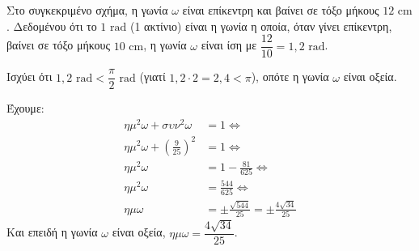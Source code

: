 \begin{alist}
\item
\begin{rlist}
\item Στο συγκεκριμένο σχήμα, η γωνία $\omega$ είναι επίκεντρη και βαίνει σε τόξο μήκους $12\text{ cm}$. Δεδομένου ότι το $1\text{ rad}$ (1 ακτίνιο) είναι η γωνία η οποία, όταν γίνει επίκεντρη, βαίνει σε τόξο μήκους $10\text{ cm}$, η γωνία $\omega$ είναι ίση με $\dfrac{12}{10} = 1{,}2\text{ rad}$.
\item Ισχύει ότι $1{,}2\text{ rad} < \dfrac{\pi}{2}\text{ rad}$ (γιατί $1{,}2 \cdot 2 = 2{,}4 < \pi$), οπότε η γωνία $\omega$ είναι οξεία.
\end{rlist}

\item Έχουμε:
\begin{align*}
\eta\mu^2\omega + \sigma\upsilon\nu^2\omega &= 1 \Leftrightarrow \\
\eta\mu^2\omega + \left(\frac{9}{25}\right)^2 &= 1 \Leftrightarrow \\
\eta\mu^2\omega &= 1 - \frac{81}{625} \Leftrightarrow \\
\eta\mu^2\omega &= \frac{544}{625} \Leftrightarrow \\
\eta\mu\omega &= \pm\frac{\sqrt{544}}{25} = \pm\frac{4\sqrt{34}}{25}
\end{align*}
Και επειδή η γωνία $\omega$ είναι οξεία, $\eta\mu\omega = \dfrac{4\sqrt{34}}{25}$.
\end{alist}
